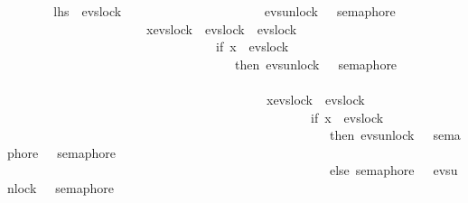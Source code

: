 \begin{isabellebody}
%
\isadelimproof
%
\endisadelimproof
%
\isatagproof
{}\isamarkupfalse%
\ {\isacharminus}{\kern0pt}\isanewline
\ \ \isamarkupfalse%
\ {\isacharasterisk}{\kern0pt}\ {\isacharcolon}{\kern0pt}\ {\isachardoublequoteopen}{\isacharquery}{\kern0pt}lhs\ {\isacharequal}{\kern0pt}\ evs{\isachardot}{\kern0pt}lock\ {}\ {\isasymrightarrow}\isanewline
\ \ \ \ \ \ \ \ \ \ \ \ \ \ \ \ \ \ \ \ {\isacharparenleft}{\kern0pt}{\isacharparenleft}{\kern0pt}evs{\isachardot}{\kern0pt}unlock\ {}\ {\isasymrightarrow}\ semaphore\ {}\ \isanewline
\ \ \ \ \ \ \ \ \ \ \ \ \ \ \ \ \ \ \ \ \ {\isacharbar}{\kern0pt}{\isacharbar}{\kern0pt}{\isacharbar}{\kern0pt}\ {\isasymbox}x{\isasymin}{\isacharbraceleft}{\kern0pt}evs{\isachardot}{\kern0pt}lock\ {}{\isacharcomma}{\kern0pt}\ evs{\isachardot}{\kern0pt}lock\ {}{\isacharcomma}{\kern0pt}\ evs{\isachardot}{\kern0pt}lock\ {}{\isacharbraceright}{\kern0pt}\isanewline
\ \ \ \ \ \ \ \ \ \ \ \ \ \ \ \ \ \ \ \ \ \ \ \ \ \ \ \ \ \ \ \ {\isasymrightarrow}\ {\isacharparenleft}{\kern0pt}if\ x\ {\isacharequal}{\kern0pt}\ evs{\isachardot}{\kern0pt}lock\ {}\isanewline
\ \ \ \ \ \ \ \ \ \ \ \ \ \ \ \ \ \ \ \ \ \ \ \ \ \ \ \ \ \ \ \ \ \ \ \ then\ evs{\isachardot}{\kern0pt}unlock\ {}\ {\isasymrightarrow}\ semaphore\ {}\ \isanewline
\ \ \ \ \ \ \ \ \ \ \ \ \ \ \ \ \ \ \ \ \ \ \ \ \ \ \ \ \ \ \ \ \ \ \ \ \ \ \ \ \ {\isacharbar}{\kern0pt}{\isacharbar}{\kern0pt}{\isacharbar}{\kern0pt}\ \isanewline
\ \ \ \ \ \ \ \ \ \ \ \ \ \ \ \ \ \ \ \ \ \ \ \ \ \ \ \ \ \ \ \ \ \ \ \ \ \ \ \ \ {\isasymbox}x{\isasymin}{\isacharbraceleft}{\kern0pt}evs{\isachardot}{\kern0pt}lock\ {}{\isacharcomma}{\kern0pt}\ evs{\isachardot}{\kern0pt}lock\ {}{\isacharbraceright}{\kern0pt}\isanewline
\ \ \ \ \ \ \ \ \ \ \ \ \ \ \ \ \ \ \ \ \ \ \ \ \ \ \ \ \ \ \ \ \ \ \ \ \ \ \ \ \ \ \ \ \ \ \ {\isasymrightarrow}\ {\isacharparenleft}{\kern0pt}if\ x\ {\isacharequal}{\kern0pt}\ evs{\isachardot}{\kern0pt}lock\ {}\ \isanewline
\ \ \ \ \ \ \ \ \ \ \ \ \ \ \ \ \ \ \ \ \ \ \ \ \ \ \ \ \ \ \ \ \ \ \ \ \ \ \ \ \ \ \ \ \ \ \ \ \ \ \ then\ evs{\isachardot}{\kern0pt}unlock\ {}\ {\isasymrightarrow}\ semaphore\ {}\ {\isacharbar}{\kern0pt}{\isacharbar}{\kern0pt}{\isacharbar}{\kern0pt}\ semaphore\ {}\isanewline
\ \ \ \ \ \ \ \ \ \ \ \ \ \ \ \ \ \ \ \ \ \ \ \ \ \ \ \ \ \ \ \ \ \ \ \ \ \ \ \ \ \ \ \ \ \ \ \ \ \ \ else\ semaphore\ {}\ {\isacharbar}{\kern0pt}{\isacharbar}{\kern0pt}{\isacharbar}{\kern0pt}\ evs{\isachardot}{\kern0pt}unlock\ {}\ {\isasymrightarrow}\ semaphore\ {}{\isacharparenright}{\kern0pt}\isanewline

\end{isabellebody}
